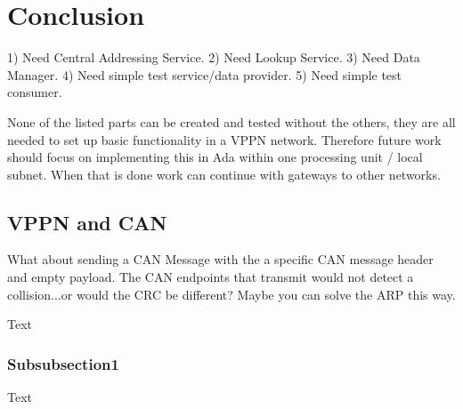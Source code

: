 \section{Conclusion}\label{sec:conclusion}
1) Need Central Addressing Service.
2) Need Lookup Service.
3) Need Data Manager.
4) Need simple test service/data provider.
5) Need simple test consumer.

None of the listed parts can be created and tested without the others, they are
all needed to set up basic functionality in a VPPN network. Therefore future
work should focus on implementing this in Ada within one processing unit /
local subnet. When that is done work can continue with gateways to other
networks.



\subsection{VPPN and CAN}
What about sending a CAN Message with the a specific CAN message header and
empty payload. The CAN endpoints that transmit would not detect a
collision...or would the CRC be different? Maybe you can solve the ARP this
way.

Text
\subsubsection{Subsubsection1}
Text
